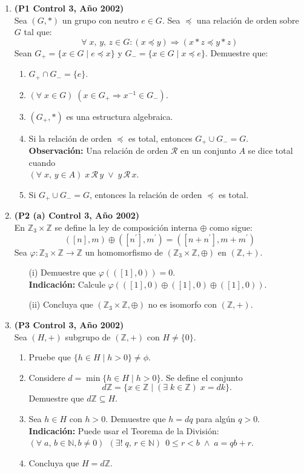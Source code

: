 \documentclass[11pt]{article}
\newcommand{\cur}[1]{\mathcal{#1}}
\newcommand{\N}{\mathbb N}
\newcommand{\Z}{\mathbb Z}
\theoremstyle{plain}
\theoremstyle{definition}
\begin{document}
\begin{enumerate}
\item \textbf{(P1 Control 3, Año 2002)}\\
Sea $(G,\ast)$ un grupo con neutro $e\in G$. Sea $\preceq$ una relación de orden sobre $G$ tal que:
$$\forall\;x,\,y,\,z\in G: (x\preceq y) \Longrightarrow (x*z\preceq y*z)$$
Sean $G_+=\{x\in G\;|\;e\preceq x\}$ y $G_-=\{x\in G\;|\;x\preceq e\}$. Demuestre que:
\begin{enumerate}
\item $G_+\cap G_-=\{e\}$.
\item $(\forall\;x\in G)\;(x\in G_+ \Longrightarrow x^{-1}\in G_-).$
\item $(G_+,*)$ es una estructura algebraica.
\item Si la relación de orden $\preceq$ es total, entonces $G_+\cup G_-=G$.\\
\textbf{Observación:} Una relación de orden $\cur{R}$ en un conjunto $A$ se dice total cuando \\$(\forall\;x,\,y\in A)\; x\,\cur{R}\,y \; \vee \;y\,\cur{R}\,x$.
\item Si $G_+\cup G_-=G$, entonces la relación de orden $\preceq$ es total.
\end{enumerate}

\item \textbf{(P2 (a) Control 3, Año 2002)}\\
En $\Z_3\times\Z$ se define la ley de composición interna $\oplus$ como sigue:
$$([n],m)\oplus([n^{\prime}],m^{\prime})=([n+n^{\prime}],m+m^{\prime})$$
Sea $\varphi: \Z_3\times \Z \longrightarrow \Z$ un homomorfismo de $(\Z_3\times \Z,\oplus)$ en $(\Z,+)$.
\begin{enumerate}
\item[(i)] Demuestre que $\varphi(([1],0))=0$.\\
\textbf{Indicación:} Calcule $\varphi(([1],0)\oplus([1],0)\oplus ([1],0)).$
\item[(ii)] Concluya que $(\Z_3\times\Z,\oplus)$ no es isomorfo con $(\Z,+)$.
\end{enumerate}

\item \textbf{(P3 Control 3, Año 2002)}\\
Sea $(H,+)$ subgrupo de $(\Z,+)$ con $H\neq \{0\}$.
\begin{enumerate}
\item Pruebe que $\{h\in H\;|\;h>0\}\neq \phi$. 
\item Considere $d=\min\{h\in H\;|\;h>0\}$.  Se define el conjunto
$$d\Z=\{x\in \Z\;|\; (\exists\;k\in\Z)\;x=dk\}.$$
Demuestre que $d\Z\subseteq H.$
\item Sea $h\in H$ con $h>0$. Demuestre que $h=dq$ para algún $q>0$.\\
\textbf{Indicación:} Puede usar el Teorema de la División:\\
$(\forall\;a,\,b\in\N,b\neq 0)\;\,(\exists !\;q,\,r\in\N)\,\;0\leq r< b \; \wedge \; a=qb+r.$
\item Concluya que $H=d\Z$.
\end{enumerate}


\end{enumerate}
\end{document}
